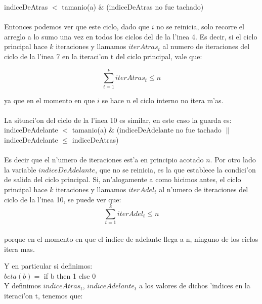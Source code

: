 indiceDeAtras $<$ tamanio(a) $\&$ (indiceDeAtras no fue tachado)\

\paragraph{}
Entonces podemos ver que este ciclo, dado que $i$ no se reinicia, solo recorre el arreglo a lo sumo una 
vez en todos los ciclos del de la l'inea 4. Es decir, si el ciclo principal hace $k$ iteraciones y llamamos 
$iterAtras_t$ al numero de iteraciones del ciclo de la l'inea 7 en la iteraci'on t del ciclo principal, vale que:

$$\sum_{t=1}^{k}iterAtras_t \leq n$$

ya que en el momento en que $i$ se hace $n$ el ciclo interno no itera m'as.
\paragraph{}
La situaci'on del ciclo de la l'inea 10 es similar, en este caso la guarda es:\\

indiceDeAdelante $<$ tamanio(a) $\&$ (indiceDeAdelante no fue tachado $\|$ indiceDeAdelante $\leq$ indiceDeAtras)

\paragraph{}
Es decir que el n'umero de iteraciones est'a en principio acotado $n$. Por otro lado la variable $indiceDeAdelante$, 
que no se reinicia, es la que establece la condici'on de salida del ciclo principal. Si, an'alogamente a como hicimos 
antes, el ciclo principal hace $k$ iteraciones y llamamos $iterAdel_t$ al n'umero de iteraciones del ciclo de 
la l'inea 10, se puede ver que:\\

$$\sum_{t=1}^{k}iterAdel_t \leq n$$\\ 

porque en el momento en que el indice de adelante llega a n, ninguno de los ciclos itera mas.

Y en particular si definimos:\\

$beta(b) =$ if b then 1 else 0 \\

Y definimos $indiceAtras_t$, $indiceAdelante_t$ a los valores de dichos 'indices en la iteraci'on t, tenemos que:\\

